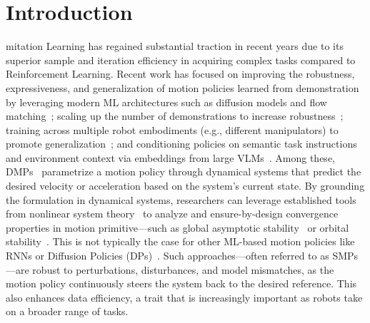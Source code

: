 \section{Introduction}
mitation Learning \citep{schaal1999imitation, zare2024survey} has regained substantial traction in recent years due to its superior sample and iteration efficiency in acquiring complex tasks compared to Reinforcement Learning. Recent work has focused on improving the robustness, expressiveness, and generalization of motion policies learned from demonstration by leveraging modern ML architectures such as diffusion models and flow matching~\citep{chi2023diffusion, black2024pi0}; scaling up the number of demonstrations to increase robustness~\citep{o2024open, black2024pi0, gemini2025robotics}; training across multiple robot embodiments (e.g., different manipulators) to promote generalization~\citep{o2024open, black2024pi0}; and conditioning policies on semantic task instructions and environment context via embeddings from large \glspl{VLM}~\citep{black2024pi0, gemini2025robotics}.
Among these, \glspl{DMP}~\citep{ijspeert2002learning, ijspeert2013dynamical, saveriano2023dynamic, hu2024fusion} parametrize a motion policy through dynamical systems that predict the desired velocity or acceleration based on the system’s current state. By grounding the formulation in dynamical systems, researchers can leverage established tools from nonlinear system theory~\citep{khalil2002nonlinear} to analyze and ensure-by-design convergence properties in motion primitive—such as global asymptotic stability~\citep{kober2009learning, ijspeert2013dynamical, rana2020euclideanizing, urain2020imitationflow, zhang2022learning, perez2023stable, perez2024puma} or orbital stability~\citep{ijspeert2002learning, kober2009learning, wensing2017sparse, urain2020imitationflow, khadivar2021learning, abu2021periodic, abu2024learning, zhi2024teaching, nah2025combining}. This is not typically the case for other ML-based motion policies like RNNs or Diffusion Policies (DPs)~\citep{chi2023diffusion, o2024open, black2024pi0, gemini2025robotics}.
Such approaches—often referred to as \glspl{SMP}—are robust to perturbations, disturbances, and model mismatches, as the motion policy continuously steers the system back to the desired reference. This also enhances data efficiency, a trait that is increasingly important as robots take on a broader range of tasks.

